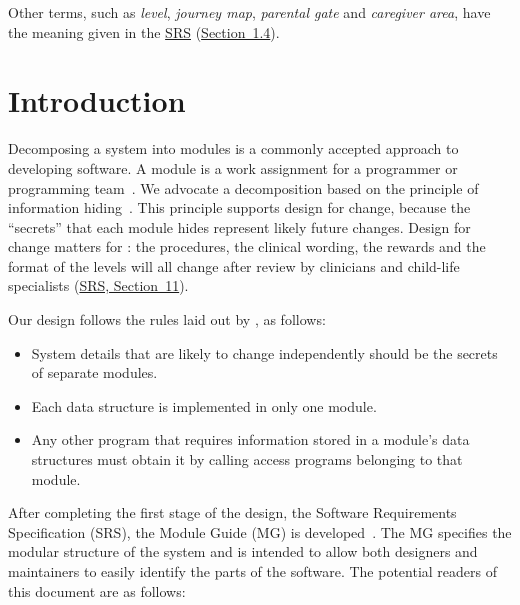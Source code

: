 \documentclass[12pt, titlepage]{article}
\newcommand{\srsurl}{https://team-hindsight.github.io/ophthamology-game/SRS/SRS.pdf}
\newcommand{\srsdoc}[1]{\href{\srsurl}{#1}}
\newcommand{\srsitemref}[2]{\href{\srsurl\#nameddest=#1}{#2}}
\begin{document}
Other terms, such as \emph{level}, \emph{journey map}, \emph{parental gate}
and \emph{caregiver area}, have the meaning given in the
\srsdoc{SRS} (\srsitemref{sec_DefinitionsAndAcronyms}{Section~1.4}).

\newpage

\tableofcontents

\listoftables

\listoffigures

\newpage


\section{Introduction}

Decomposing a system into modules is a commonly accepted approach to developing
software.  A module is a work assignment for a programmer or programming
team~\citep{ParnasEtAl1984}.  We advocate a decomposition
based on the principle of information hiding~\citep{Parnas1972a}.  This
principle supports design for change, because the ``secrets'' that each module
hides represent likely future changes. Design for change matters for
\progname{}: the procedures, the clinical wording, the rewards and the format
of the levels will all change after review by clinicians and child-life
specialists (\srsitemref{sec_LikelyChanges}{SRS, Section~11}).

Our design follows the rules laid out by \citet{ParnasEtAl1984}, as follows:
\begin{itemize}
\item System details that are likely to change independently should be the
  secrets of separate modules.
\item Each data structure is implemented in only one module.
\item Any other program that requires information stored in a module's data
  structures must obtain it by calling access programs belonging to that module.
\end{itemize}

After completing the first stage of the design, the Software Requirements
Specification (SRS), the Module Guide (MG) is developed~\citep{ParnasEtAl1984}.
The MG specifies the modular structure of the system and is intended to allow
both designers and maintainers to easily identify the parts of the software.
The potential readers of this document are as follows:
\end{document}

